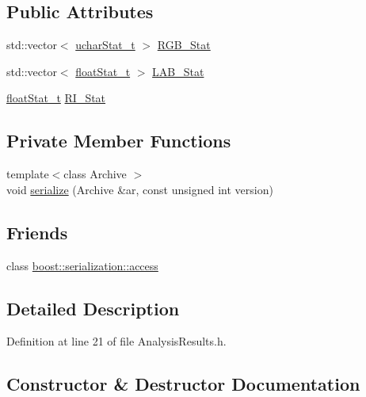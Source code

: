 \subsection*{Public Attributes}
\begin{DoxyCompactItemize}
\item 
std\+::vector$<$ \hyperlink{_stats_8h_a5b876b087ada3df30b8dd6309fc25191}{uchar\+Stat\+\_\+t} $>$ \hyperlink{class_soil_analyzer_1_1_analysis_results_ab35eca5f2cfca4b80797cfc314d5cdf5}{R\+G\+B\+\_\+\+Stat}
\item 
std\+::vector$<$ \hyperlink{_stats_8h_a5f9676504b14f796e82c229b4dddc50b}{float\+Stat\+\_\+t} $>$ \hyperlink{class_soil_analyzer_1_1_analysis_results_ae931f7b47ece1f91dc3427520ef4a9b2}{L\+A\+B\+\_\+\+Stat}
\item 
\hyperlink{_stats_8h_a5f9676504b14f796e82c229b4dddc50b}{float\+Stat\+\_\+t} \hyperlink{class_soil_analyzer_1_1_analysis_results_a3bbccb36afd62b9a35b7afa578c4919d}{R\+I\+\_\+\+Stat}
\end{DoxyCompactItemize}
\subsection*{Private Member Functions}
\begin{DoxyCompactItemize}
\item 
{\footnotesize template$<$class Archive $>$ }\\void \hyperlink{class_soil_analyzer_1_1_analysis_results_a64f3587b6a868fc82a72369b3883459a}{serialize} (Archive \&ar, const unsigned int version)
\end{DoxyCompactItemize}
\subsection*{Friends}
\begin{DoxyCompactItemize}
\item 
class \hyperlink{class_soil_analyzer_1_1_analysis_results_ac98d07dd8f7b70e16ccb9a01abf56b9c}{boost\+::serialization\+::access}
\end{DoxyCompactItemize}


\subsection{Detailed Description}


Definition at line 21 of file Analysis\+Results.\+h.



\subsection{Constructor \& Destructor Documentation}
\hypertarget{class_soil_analyzer_1_1_analysis_results_a893864c1e4bf50bf6979088a390da482}{}
